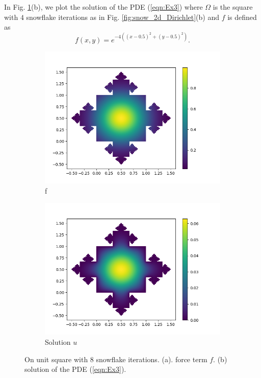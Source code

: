 \documentclass[12pt]{article}%
\theoremstyle{plain}
\numberwithin{equation}{section}
\begin{document}
 In Fig. \ref{Ex3_solution}(b), we plot the solution of the PDE (\ref{eqn:Ex3}) where $\Omega$ is the square with $4$ snowflake iterations as in Fig. \ref{fig:snow_2d_Dirichlet}(b) and $f$ is defined as 
  $$
 f(x,y)=e^{-4((x-0.5)^2+(y-0.5)^2)}.
 $$
 \begin{figure}[H]%
    \centering
         \begin{subfigure}[h]{0.45\linewidth}
         \caption{f}
\includegraphics[width=\linewidth]{figures/Ex3/Ex3_f_n8.png}
\end{subfigure}
 \begin{subfigure}[h]{0.45\linewidth}
         \caption{Solution $u$}
\includegraphics[width=\linewidth]{figures/Ex3/Ex3_solution_n8.png}
\end{subfigure}
  \caption{On unit square with $8$ snowflake iterations.   (a). force term $f$. (b) solution of the PDE (\ref{eqn:Ex3}). }
  \label{Ex3_solution}
 \end{figure}
 
\end{document}
